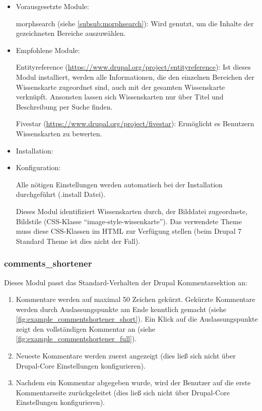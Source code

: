 \begin{itemize}[parsep=0pt, itemsep=5.0pt plus 2.0pt minus 1.0pt, leftmargin=*]
	\item Vorausgesetzte Module:

	morphsearch (siehe \cref{subsub:morphsearch}): Wird genutzt, um die Inhalte der gezeichneten Bereiche auszuwählen.


	\item Empfohlene Module:

	Entityreference (\url{https://www.drupal.org/project/entityreference}): Ist dieses Modul installiert, werden alle Informationen, die den einzelnen Bereichen der Wissenskarte zugeordnet sind, auch mit der gesamten Wissenskarte verknüpft. Ansonsten lassen sich Wissenskarten nur über Titel und Beschreibung per Suche finden.

	Fivestar (\url{https://www.drupal.org/project/fivestar}): Ermöglicht es Benutzern Wissenskarten zu bewerten.


	\item Installation: \standardinstall


	\item Konfiguration:

	\noconfig

	Alle nötigen Einstellungen werden automatisch bei der Installation durchgeführt (.install Datei).

	Dieses Modul identifiziert Wissenskarten durch, der Bilddatei zugeordnete, Bildstile (\zB CSS-Klasse \enquote{image-style-wissenkarte}). Das verwendete Theme muss diese CSS-Klassen im HTML zur Verfügung stellen (beim Drupal 7 Standard Theme ist dies nicht der Fall).
\end{itemize}



\subsubsection{comments\_shortener}\label{subsub:commentsshortener}
Dieses Modul passt das Standard-Verhalten der Drupal Kommentarsektion an:

\begin{enumerate}
	\item Kommentare werden auf maximal 50 Zeichen gekürzt. Gekürzte Kommentare werden durch Auslassungspunkte am Ende kenntlich gemacht (siehe \cref{fig:example_commentshortener_short}). Ein Klick auf die Auslassungspunkte zeigt den vollständigen Kommentar an (siehe \cref{fig:example_commentshortener_full}).

	\item Neueste Kommentare werden zuerst angezeigt (dies ließ sich nicht über Drupal-Core Einstellungen konfigurieren).

	\item Nachdem ein Kommentar abgegeben wurde, wird der Benutzer auf die erste Kommentarseite zurückgeleitet (dies ließ sich nicht über Drupal-Core Einstellungen konfigurieren).
\end{enumerate}

